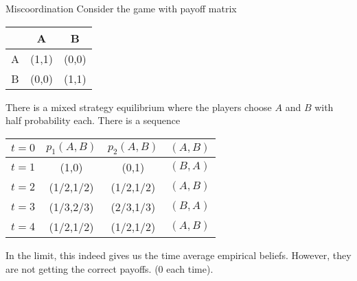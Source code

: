\begin{aexample}{Miscoordination}{}
    Consider the game with payoff matrix
    \begin{center}
       
        \begin{tabular}{|c|c c|} 
            \hline &A & B\\
            
            \hline
            A&(1,1)&(0,0)\\
            \hline B&(0,0)&(1,1)
            \\ \hline
        \end{tabular}
        \end{center}

    There is a mixed strategy equilibrium where the players choose $A$ and $B$ with half probability each.
    There is a sequence 
    \begin{center}
        \begin{tabular}{|c|c c c|} 
            \hline 
            $t=0$ & $p_1(A,B)$&$p_2(A,B)$& $(A,B)$\\
            \hline $t=1$ & (1,0) & (0,1) & $(B,A)$\\
            \hline
            $t=2$ & (1/2,1/2)& (1/2,1/2) & $(A,B)$\\
            \hline 
            $t=3$ & (1/3,2/3) & (2/3,1/3) & $(B,A)$
            \\
            \hline 
            $t=4$ & (1/2,1/2)& (1/2,1/2)  & $(A,B)$\\ \hline
        \end{tabular}
        \end{center}
        In the limit, this indeed gives us the time average empirical beliefs. However, they are not getting the correct payoffs. (0 each time).
\end{aexample}
